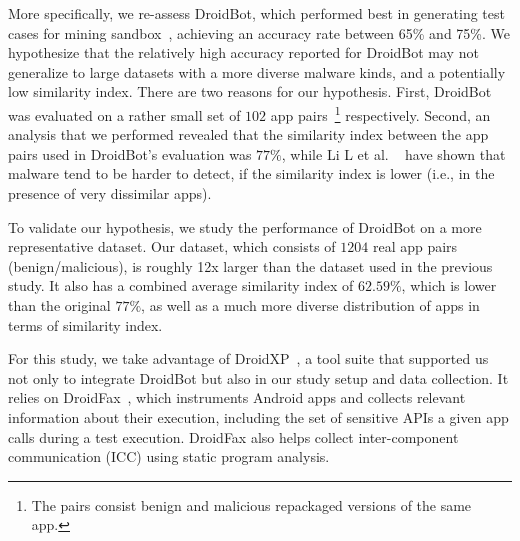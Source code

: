 %
More specifically, we re-assess DroidBot, which performed best in generating test cases for mining sandbox~\cite{DBLP:conf/wcre/BaoLL18,DBLP:journals/jss/CostaMMSSBNR22}, achieving an accuracy rate between 65\% and 75\%. We hypothesize that the relatively high accuracy reported for DroidBot 
may not generalize to large datasets with a more diverse malware kinds, and a potentially low similarity index.
There are two reasons for our hypothesis. First, DroidBot was evaluated on a rather small set of $102$ app pairs~\footnote{The pairs consist benign and malicious repackaged versions of the same app.} respectively. 
Second, an analysis that we performed revealed that the similarity index between the app pairs used in DroidBot's evaluation was $77\%$, while Li L et al. ~\cite{DBLP:journals/tifs/0029LBKTLC17} %
have shown that malware tend to be harder to detect, if the similarity index is lower 
(i.e., in the presence of very dissimilar apps). 

To validate our hypothesis, we study the performance of DroidBot on a more representative dataset. 
Our dataset, which consists of $1204$ real app pairs (benign/malicious), is 
roughly 12x larger than the dataset used in the previous study. It also has a combined average similarity index of $62.59\%$, which is lower than the original $77\%$, 
as well as a much more diverse distribution of apps in terms of similarity index.

For this study, we take advantage of DroidXP~\cite{DBLP:conf/scam/CostaMCMVBC20}, a tool suite that supported us not only to integrate DroidBot but also in our study setup and data collection. It relies on DroidFax~\cite{DBLP:conf/icsm/CaiR17a}, which instruments Android apps and collects relevant information about their execution, including the set of sensitive APIs a given app calls during a test execution. DroidFax also helps collect inter-component communication (ICC) using  static program analysis.

